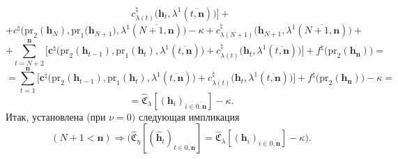 \documentclass[11pt,twoside]{report}
\newcommand{\bfn}{\begin{equation}}
\newcommand{\efn}{\end{equation}}
\newcommand{\ov}{\overline}
\newcommand{\la}{\lambda}
\newcommand{\nn}{{\mathbf n}}
\begin{document}
{{$$c_{\la(t)}^\natural\bigl(\mathbf{h}_t,\la^1(\ov{t,\mathbf{n}})\bigl)\bigl] +
$$
$$
+ c^\natural\bigl(\mathrm{pr}_2(\mathbf{h}_N),\mathrm{pr}_1\bigl(\mathbf{h}_{N+1}),
\la^1(\ov{N+1,\mathbf{n}})\bigl) - \kappa +
c_{\la(N+1)}^\natural\bigl(\mathbf{h}_{N+1},\la^1(\ov{N+1,\nn})\bigl)+ $$
$$
+ \sum\limits_{t=N+2}^\mathbf{n}\bigl[\mathbf{c}^\natural\bigl(\mathrm{pr}_2(\mathbf{h}_{t-1}),
\mathrm{pr}_1(\mathbf{h}_t),\la^1(\ov{t,\mathbf{n}})\bigl) + c_{\la(t)}^\natural\bigl(\mathbf{h}_t,
\la^1(\ov{t,\mathbf{n}})\bigl)\bigl] + f^\natural\bigl(\mathrm{pr}_2(\mathbf{h}_\mathbf{n})\bigl) =
$$
$$
= \sum\limits_{t=1}^\mathbf{n}\bigl[\mathbf{c}^\natural\bigl(\mathrm{pr}_2(\mathbf{h}_{t-1}),
\mathrm{pr}_1(\mathbf{h}_t),\la^1(\ov{t,\mathbf{n}})\bigl) +
c_{\la(t)}^\natural\bigl(\mathbf{h}_t,\la^1(\ov{t,\mathbf{n}})\bigl)\bigl] +
f^\natural\bigl(\mathrm{pr}_2(\mathbf{h}_\mathbf{n})\bigl) -\kappa =
$$
$$
= \widehat{\mathfrak{C}}_\la[(\mathbf{h}_i)_{i\in\ov{0,\mathbf{n}}}] - \kappa.
$$
Итак, установлена (при $\nu =0)$ следующая импликация
\bfn\label{4.5.49}
(N+1 < \mathbf{n}) \Longrightarrow \bigl(\widehat{\mathfrak{C}}_\eta[(\hat{\mathbf{h}}_t)_{t\in \ov{0,\mathbf{n}}}] =
\widehat{\mathfrak{C}}_\la[(\mathbf{h}_i)_{i\in \ov{0,\mathbf{n}}}] - \kappa\bigl).
\efn

}}
\end{document}
